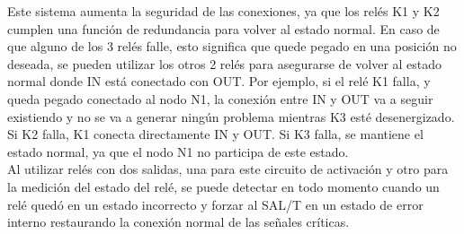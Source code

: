 Este sistema aumenta la seguridad de las conexiones, ya que los relés K1 y K2 cumplen una función de redundancia para volver al estado normal. En caso de que alguno de los 3 relés falle, esto significa que quede pegado en una posición no deseada, se pueden utilizar los otros 2 relés para asegurarse de volver al estado normal donde IN está conectado con OUT. Por ejemplo, si el relé K1 falla, y queda pegado conectado al nodo N1, la conexión entre IN y OUT va a seguir existiendo y no se va a generar ningún problema mientras K3 esté desenergizado. Si K2 falla, K1 conecta directamente IN y OUT. Si K3 falla, se mantiene el estado normal, ya que el nodo N1 no participa de este estado. \\ 

Al utilizar relés con dos salidas, una para este circuito de activación y otro para la medición del estado del relé, se puede detectar en todo momento cuando un relé quedó en un estado incorrecto y forzar al SAL/T en un estado de error interno restaurando la conexión normal de las señales críticas. 
